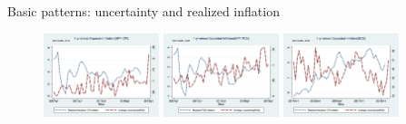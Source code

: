 \documentclass{beamer}
\begin{document}
\begin{frame}{Basic patterns: uncertainty and realized inflation}
	\begin{figure}
		\centering
		\label{InfVar}
		\includegraphics[width=0.3\textwidth]{figuresDraft/Inf1yf_CPIAU_varSPFCPIQ.png}
		\includegraphics[width=0.3\textwidth]{figuresDraft/Inf1yf_PCE_varSPFPCEQ.png}
		\includegraphics[width=0.3\textwidth]{figuresDraft/Inf1yf_CPIAU_varSCEM.png}
	\end{figure}

\end{frame}
\end{document}
